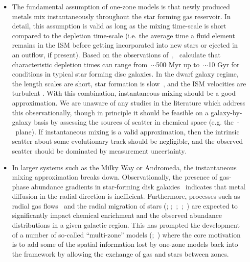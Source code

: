 \documentclass[ms.tex]{subfiles}
\begin{document}
\begin{itemize}	

	\item The fundamental assumption of one-zone models is that newly produced
	metals mix instantaneously throughout the star forming gas reservoir.
	In detail, this assumption is valid as long as the mixing time-scale
	is short compared to the depletion time-scale (i.e. the average time a
	fluid element remains in the ISM before getting incorporated into new
	stars or ejected in an outflow, if present).
	Based on the observations of~\citet{Leroy2008},~\citet*{Weinberg2017}
	calculate that characteristic depletion times can range from~$\sim$500 Myr
	up to~$\sim$10 Gyr for conditions in typical star forming disc galaxies.
	In the dwarf galaxy regime, the length scales are short, star formation
	is slow~\citep[e.g.][]{Hudson2015}, and the ISM velocities are turbulent
	\citep{Dutta2009, Stilp2013, Schleicher2016}.
	With this combination, instantaneous mixing should be a good approximation.
	We are unaware of any studies in the literature which address this
	observationally, though in principle it should be feasible on a
	galaxy-by-galaxy basis by assessing the sources of scatter in chemical
	space (e.g. the~\afe-\feh~plane).
	If instantaneous mixing is a valid approximation, then the intrinsic
	scatter about some evolutionary track should be negligible, and the
	observed scatter should be dominated by measurement uncertainty.

	\item In larger systems such as the Milky Way or Andromeda, the
	instantaneous mixing approximation breaks down.
	Observationally, the presence of gas-phase abundance gradients in
	star-forming disk galaxies~\citep*[see, e.g., recent reviews
	by][]{Kewley2019, Maiolino2019, Sanchez2020} indicates that metal diffusion
	in the radial direction is inefficient.
	Furthermore, processes such as radial gas flows~\citep{Lacey1985,
	Bilitewski2012, Vincenzo2020, Sharda2021} and the radial migration of stars
	(\citealp{Sellwood2002, Roskar2008a, Roskar2008b, Loebman2011, Minchev2011};
	\citealp*{Bird2012};~\citealp{Bird2013};~\citealp*{Grand2012a, Grand2012b,
	Kubryk2013};~\citealp{Okalidis2022}) are expected to significantly
	impact chemical enrichment and the observed abundance distributions in a
	given galactic region.
	This has prompted the development of a number of so-called ``multi-zone''
	models (\citealp*{Minchev2013, Minchev2014};~\citealp{Minchev2017,
	Johnson2021, Chen2022}) where the core motivation is to add some of the
	spatial information lost by one-zone models back into the framework by
	allowing the exchange of gas and stars between zones.


\end{itemize}
\end{document}

